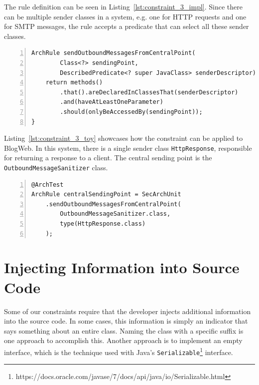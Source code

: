 The rule definition can be seen in Listing~\ref{lst:constraint_3_impl}. Since there can be multiple sender classes in a system, e.g. one for HTTP requests and one for SMTP messages, the rule accepts a predicate that can select all these sender classes.

\begin{minipage}{\linewidth}
\begin{lstlisting}[caption={Rule definition for constraint 3.}, captionpos=b, label=lst:constraint_3_impl, numbers=left]
ArchRule sendOutboundMessagesFromCentralPoint(
        Class<?> sendingPoint,
        DescribedPredicate<? super JavaClass> senderDescriptor) {
    return methods()
        .that().areDeclaredInClassesThat(senderDescriptor)
        .and(haveAtLeastOneParameter)
        .should(onlyBeAccessedBy(sendingPoint));
}
\end{lstlisting}
\end{minipage}

Listing~\ref{lst:constraint_3_toy} showcases how the constraint can be applied to BlogWeb. In this system, there is a single sender class \texttt{HttpResponse}, responsible for returning a response to a client. The central sending point is the \texttt{OutboundMessageSanitizer} class. 

\begin{minipage}{\linewidth}
\begin{lstlisting}[caption={Application of constraint 3 to BlogWeb.}, captionpos=b, label=lst:constraint_3_toy, numbers=left]
@ArchTest
ArchRule centralSendingPoint = SecArchUnit
    .sendOutboundMessagesFromCentralPoint(
        OutboundMessageSanitizer.class,
        type(HttpResponse.class)
    );
\end{lstlisting}
\end{minipage}




\section{Injecting Information into Source Code}

Some of our constraints require that the developer injects additional information into the source code. In some cases, this information is simply an indicator that says something about an entire class. Naming the class with a specific suffix is one approach to accomplish this. Another approach is to implement an empty interface, which is the technique used with Java's \texttt{Serializable}\footnote{https://docs.oracle.com/javase/7/docs/api/java/io/Serializable.html} interface. 

